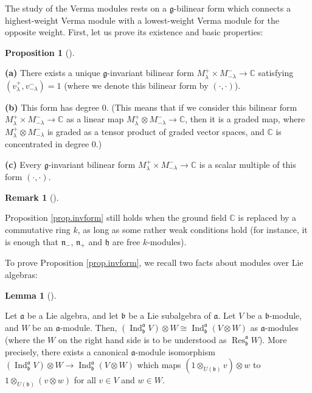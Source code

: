 \documentclass
[numbers=enddot,12pt,final,onecolumn,german,notitlepage]{scrartcl}%
\theoremstyle{definition}
\newtheorem{lem}[theo]{Lemma}
\newenvironment{lemma}[1][]
{\begin{lem}[#1]\begin{leftbar}}
{\end{leftbar}\end{lem}}
\newtheorem{prop}[theo]{Proposition}
\newenvironment{proposition}[1][]
{\begin{prop}[#1]\begin{leftbar}}
{\end{leftbar}\end{prop}}
\newtheorem{remk}[theo]{Remark}
\newenvironment{remark}[1][]
{\begin{remk}[#1]\begin{leftbar}}
{\end{leftbar}\end{remk}}
\begin{document}
The study of the Verma modules rests on a $\mathfrak{g}$-bilinear form which
connects a highest-weight Verma module with a lowest-weight Verma module for
the opposite weight. First, let us prove its existence and basic properties:

\begin{proposition}
\label{prop.invform}\textbf{(a)} There exists a unique $\mathfrak{g}%
$-invariant bilinear form $M_{\lambda}^{+}\times M_{-\lambda}^{-}%
\rightarrow\mathbb{C}$ satisfying $\left(  v_{\lambda}^{+},v_{-\lambda}%
^{-}\right)  =1$ (where we denote this bilinear form by $\left(  \cdot
,\cdot\right)  $).

\textbf{(b)} This form has degree $0$. (This means that if we consider this
bilinear form $M_{\lambda}^{+}\times M_{-\lambda}^{-}\rightarrow\mathbb{C}$ as
a linear map $M_{\lambda}^{+}\otimes M_{-\lambda}^{-}\rightarrow\mathbb{C}$,
then it is a graded map, where $M_{\lambda}^{+}\otimes M_{-\lambda}^{-}$ is
graded as a tensor product of graded vector spaces, and $\mathbb{C}$ is
concentrated in degree $0$.)

\textbf{(c)} Every $\mathfrak{g}$-invariant bilinear form $M_{\lambda}%
^{+}\times M_{-\lambda}^{-}\rightarrow\mathbb{C}$ is a scalar multiple of this
form $\left(  \cdot,\cdot\right)  $.
\end{proposition}

\begin{remark}
\label{rmk.invform.1}Proposition \ref{prop.invform} still holds when the
ground field $\mathbb{C}$ is replaced by a commutative ring $k$, as long as
some rather weak conditions hold (for instance, it is enough that
$\mathfrak{n}_{-}$, $\mathfrak{n}_{+}$ and $\mathfrak{h}$ are free $k$-modules).
\end{remark}

To prove Proposition \ref{prop.invform}, we recall two facts about modules
over Lie algebras:

\begin{lemma}
\label{lem.pushpull}Let $\mathfrak{a}$ be a Lie algebra, and let
$\mathfrak{b}$ be a Lie subalgebra of $\mathfrak{a}$. Let $V$ be a
$\mathfrak{b}$-module, and $W$ be an $\mathfrak{a}$-module. Then, $\left(
\operatorname*{Ind}\nolimits_{\mathfrak{b}}^{\mathfrak{a}}V\right)  \otimes
W\cong\operatorname*{Ind}\nolimits_{\mathfrak{b}}^{\mathfrak{a}}\left(
V\otimes W\right)  $ as $\mathfrak{a}$-modules (where the $W$ on the right
hand side is to be understood as $\operatorname*{Res}\nolimits_{\mathfrak{b}%
}^{\mathfrak{a}}W$). More precisely, there exists a canonical $\mathfrak{a}%
$-module isomorphism $\left(  \operatorname*{Ind}\nolimits_{\mathfrak{b}%
}^{\mathfrak{a}}V\right)  \otimes W\rightarrow\operatorname*{Ind}%
\nolimits_{\mathfrak{b}}^{\mathfrak{a}}\left(  V\otimes W\right)  $ which maps
$\left(  1\otimes_{U\left(  \mathfrak{b}\right)  }v\right)  \otimes w$ to
$1\otimes_{U\left(  \mathfrak{b}\right)  }\left(  v\otimes w\right)  $ for all
$v\in V$ and $w\in W$.
\end{lemma}
\end{document}
